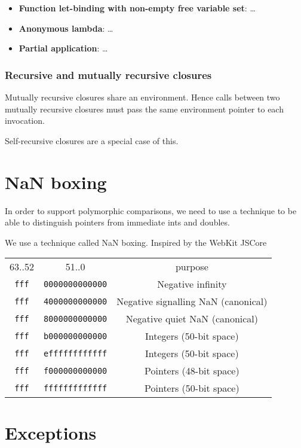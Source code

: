 \documentclass[12pt,a4paper,twoside,openright]{report}
\begin{document}
\begin{itemize}
    \item \textbf{Function let-binding with non-empty free variable set}:
        \ldots
    \item \textbf{Anonymous lambda}:
        \ldots
    \item \textbf{Partial application}:
        \ldots
\end{itemize}

\subsubsection{Recursive and mutually recursive closures}

Mutually recursive closures share an environment. Hence calls between two mutually recursive closures must pass the same environment pointer to each invocation.

Self-recursive closures are a special case of this.


\section{NaN boxing}

In order to support polymorphic comparisons, we need to use a technique to be able to distinguish pointers from immediate ints and doubles.

We use a technique called NaN boxing. Inspired by the WebKit JSCore

\begin{tabular}{c c c}
    63..52 & 51..0 & purpose \\
    \lstinline!fff! & \lstinline!0000000000000! & Negative infinity \\
    \lstinline!fff! & \lstinline!4000000000000! & Negative signalling NaN (canonical) \\
    \lstinline!fff! & \lstinline!8000000000000! & Negative quiet NaN (canonical) \\
    \lstinline!fff! & \lstinline!b000000000000! & Integers (50-bit space) \\
    \lstinline!fff! & \lstinline!effffffffffff! & Integers (50-bit space) \\
    \lstinline!fff! & \lstinline!f000000000000! & Pointers (48-bit space) \\
    \lstinline!fff! & \lstinline!fffffffffffff! & Pointers (50-bit space)
\end{tabular}



\section{Exceptions}
\end{document}
